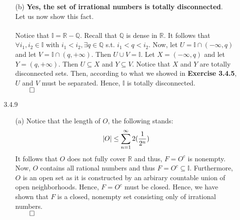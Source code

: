 \documentclass[11pt]{article}
\DeclarePairedDelimiter\abs{\lvert}{\rvert}%
\newcommand{\reals}{\mathbb{R}}
\newcommand{\rats}{\mathbb{Q}}
\newcommand{\irrats}{\mathbb{I}}
\begin{document}
\begin{itemize}
\begin{itemize}
            \item[(b)]
                \textbf{Yes, the set of irrational numbers is totally
                disconnected}.
                \\
                Let us now show this fact.
                \\
                \\
                Notice that $\irrats = \reals - \rats$. Recall that $\rats$ is
                dense in $\reals$. It follows that $\forall i_1, i_2 \in
                \irrats$ with $i_1 < i_2, \exists q \in \rats$ s.t. $i_1 < q <
                i_2$. Now, let $U = \irrats \cap (-\infty, q)$ and let $V =
                \irrats \cap (q, +\infty)$. Then $U \cup V = \irrats$. Let $X =
                (-\infty, q)$ and let $Y = (q, +\infty)$. Then $U \subseteq X$
                and $Y \subseteq V$. Notice that $X$ and $Y$ are totally
                disconnected sets. Then, according to what we showed in
                \textbf{Exercise 3.4.5}, $U$ and $V$ must be separated. Hence,
                $\irrats$ is totally disconnected.\\
                $\qed$
        \end{itemize}

    \item[3.4.9]
        \begin{itemize}
            \item[(a)]
                Notice that the length of $O$, the following stands:
                \begin{equation*}
                    \abs{O} \leq \sum_{n = 1}^\infty 2(\dfrac{1}{2^n})
                \end{equation*}
                It follows that $O$ does not fully cover $\reals$ and thus, $F
                = O^c$ is nonempty. Now, $O$ contains all rational numbers and
                thus $F = O^c \subseteq \irrats$. Furthermore, $O$ is an open
                set as it is constructed by an arbirary countable union of open
                neighborhoods. Hence, $F = O^c$ must be closed. Hence, we have
                shown that $F$ is a closed, nonempty set consisting only of
                irrational numbers.\\
                $\qed$


\end{itemize}
\end{itemize}
\end{document}
